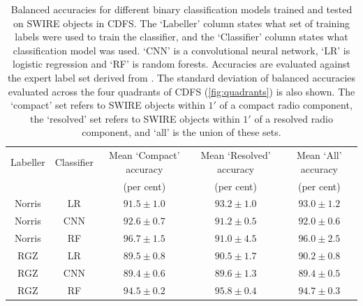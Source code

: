   \begin{table}
    \caption[Balanced accuracies for different binary classification models on CDFS.]{Balanced accuracies for different binary classification models trained and tested on SWIRE objects in CDFS.
    The `Labeller' column states what set of training labels
    were used to train the classifier, and the `Classifier' column states what
    classification model was used. `CNN' is a convolutional neural network,
    `LR' is logistic regression and `RF' is random forests. Accuracies are evaluated against the expert
    label set derived from \citet{norris06}. The standard deviation of balanced accuracies evaluated across the four quadrants of
    CDFS (\autoref{fig:quadrants}) is also shown. The `compact' set refers to SWIRE
    objects within $1'$ of a compact radio component, the `resolved' set refers to
    SWIRE objects within $1'$ of a resolved radio component, and `all' is the union of these sets.}
    \label{tab:cdfs-ba}
    \begin{tabular}{ccccc}
    \hline
    Labeller & Classifier & Mean `Compact' accuracy & Mean `Resolved' accuracy & Mean `All' accuracy\\
     &  & (per cent) & (per cent) & (per cent)\\
    \hline
    Norris & LR & $91.5 \pm 1.0$ & $93.2 \pm 1.0$ & $93.0 \pm 1.2$\\
    Norris & CNN & $92.6 \pm 0.7$ & $91.2 \pm 0.5$ & $92.0 \pm 0.6$\\
    Norris & RF & $96.7 \pm 1.5$ & $91.0 \pm 4.5$ & $96.0 \pm 2.5$\\
    RGZ & LR & $89.5 \pm 0.8$ & $90.5 \pm 1.7$ & $90.2 \pm 0.8$\\
    RGZ & CNN & $89.4 \pm 0.6$ & $89.6 \pm 1.3$ & $89.4 \pm 0.5$\\
    RGZ & RF & $94.5 \pm 0.2$ & $95.8 \pm 0.4$ & $94.7 \pm 0.3$\\
    \hline
    \end{tabular}
  \end{table}

